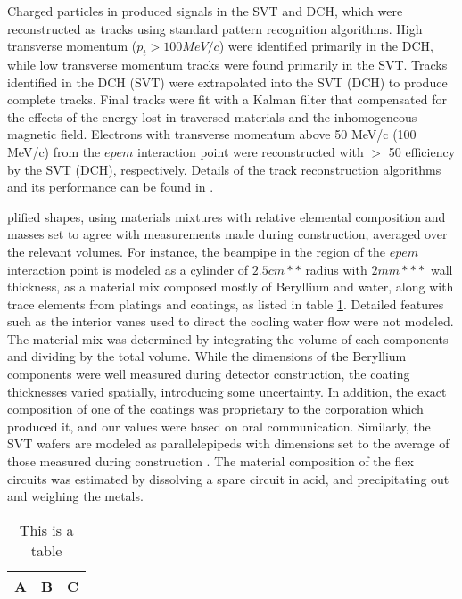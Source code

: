 Charged particles in \babar produced signals in the SVT and DCH, which were
reconstructed as tracks using standard pattern recognition algorithms.  High
transverse momentum ($p_t > 100 MeV/c$) were identified primarily in the DCH,
while low transverse momentum tracks were found primarily in the SVT.  Tracks
identified in the DCH (SVT) were extrapolated into the SVT (DCH) to produce
complete tracks.  Final tracks were fit with a Kalman filter that compensated
for the effects of the energy lost in traversed materials and the inhomogeneous
\babar magnetic field.  Electrons with transverse momentum above 50 MeV/c (100
MeV/c) from the $epem$ interaction point were reconstructed with $>$ 50%
efficiency by the SVT (DCH), respectively.  Details of the \babar track
reconstruction algorithms and its performance can be found in \cite{babarnim2}.

plified shapes, using materials mixtures with relative elemental composition
and masses set to agree with measurements made during construction, averaged
over the relevant volumes.  For instance, the beampipe in the region of the
$epem$ interaction point is modeled as a cylinder of $2.5cm**$ radius with $2mm***$
wall thickness, as a material mix composed mostly of Beryllium and water, along
with trace elements from platings and coatings, as listed in table
\ref{tab:materials}.  Detailed features such as the interior vanes used to
direct the cooling water flow were not modeled.  The material mix was
determined by integrating the volume of each components and dividing by the
total volume.  While the dimensions of the Beryllium components were well
measured during detector construction, the coating thicknesses varied
spatially, introducing some uncertainty.  In addition, the exact composition of
one of the coatings \cite{paint} was proprietary to the corporation which
produced it, and our values were based on oral communication.  Similarly, the
SVT wafers are modeled as parallelepipeds with dimensions set to the average of
those measured during construction \cite{babarnim}.  The material composition of
the flex circuits was estimated by dissolving a spare circuit in acid, and
precipitating out and weighing the metals.

\begin{table}[htb]
\begin{center}
\caption{This is a table}
\label{tab:materials}
\begin{tabular}{||c|c|c||}
\hline
A & B & C \\
\hline
\end{tabular}
\end{center}
\end{table}


